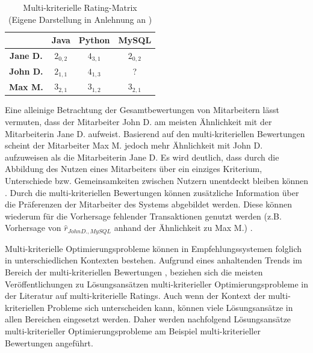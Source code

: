 \begin{table}[htbp]
    \begin{center}
    \begin{tabular}{|c||c|c|c|}
    \hline
    {} & {\textbf{Java}} & {\textbf{Python}} & {\textbf{MySQL}}\\
    \hline
    \hline
    \textbf{Jane D.} & $2_{0,2}$ & $4_{3,1}$ & $2_{0,2}$ \\
    \hline
    \textbf{John D.} & $2_{1,1}$ & $4_{1,3}$ & ? \\
    \hline
    \textbf{Max M.} & $3_{2,1}$ & $3_{1,2}$ & $3_{2,1}$ \\
    \hline
    \end{tabular}
    \end{center}
    \caption[Multi-kriterielle Rating-Matrix ]{Multi-kriterielle Rating-Matrix \\
    (Eigene Darstellung in Anlehnung an \cite[S. 51]{adomavicius:inproceedings:2})}
	\label{tab3}
\end{table}

Eine alleinige Betrachtung der Gesamtbewertungen von Mitarbeitern lässt vermuten, dass der Mitarbeiter John D. am meisten Ähnlichkeit mit der Mitarbeiterin Jane D. aufweist.
Basierend auf den multi-kriteriellen Bewertungen scheint der Mitarbeiter Max M. jedoch mehr Ähnlichkeit mit John D. aufzuweisen als die Mitarbeiterin Jane D.
Es wird deutlich, dass durch die Abbildung des Nutzen eines Mitarbeiters über ein einziges Kriterium, Unterschiede bzw. Gemeinsamkeiten zwischen Nutzern unentdeckt bleiben können \cite[S. 854]{adomavicius:4:inbook}.
Durch die multi-kriteriellen Bewertungen können zusätzliche Information über die Präferenzen der Mitarbeiter des Systems abgebildet werden.
Diese können wiederum für die Vorhersage fehlender Transaktionen genutzt werden (z.B. Vorhersage von $\hat{r}_{John D., MySQL}$ anhand der Ähnlichkeit zu Max M.) \cite[S. 848]{adomavicius:4:inbook}.

Multi-kriterielle Optimierungsprobleme können in Empfehlungssystemen folglich in unterschiedlichen Kontexten bestehen.
Aufgrund eines anhaltenden Trends im Bereich der multi-kriteriellen Bewertungen \cite[S. 851]{adomavicius:4:inbook}, beziehen sich die meisten Veröffentlichungen zu Lösungsansätzen multi-kriteriel\-ler Optimierungsprobleme in der Literatur auf multi-kriterielle Ratings.
Auch wenn der Kontext der multi-kriteriellen Probleme sich unterscheiden kann, können viele Lösungsansätze in allen Bereichen eingesetzt werden.
Daher werden nachfolgend Lösungsansätze multi-kriterieller Optimierungsprobleme am Beispiel multi-kriterieller Bewertungen angeführt.

